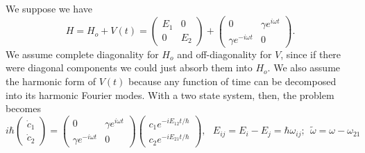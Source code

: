 \documentclass[fontsize=12pt]{scrartcl}
\begin{document}
We suppose we have $$H=H_o+V(t)=\left(\begin{matrix}
E_1 & 0 \\ 0 & E_2
\end{matrix}\right)+\left(\begin{matrix}
0 & \gamma e^{i\omega t} \\ \gamma e^{-i\omega t} & 0
\end{matrix}\right).$$ We assume complete diagonality for $H_o$ and off-diagonality for $V$, since if there were diagonal components we could just absorb them into $H_o$. We also assume the harmonic form of $V(t)$ because any function of time can be decomposed into its harmonic Fourier modes. With a two state system, then, the problem becomes $$i\hbar\left(\begin{matrix}
\dot{c}_1\\\dot{c}_2
\end{matrix}\right) =\left(\begin{matrix}
0 & \gamma e^{i\omega t} \\ \gamma e^{-i\omega t} & 0
\end{matrix}\right) \left(\begin{matrix}
c_1e^{-iE_{12}t/\hbar}\\c_2e^{-iE_{21}t/\hbar}
\end{matrix}\right), \ \ \ E_{ij}=E_i-E_j=\hbar\omega_{ij}; \ \ \tilde{\omega}=\omega-\omega_{21} $$
\end{document}
